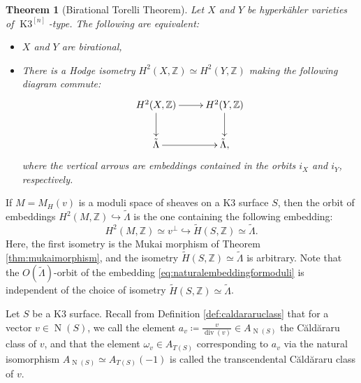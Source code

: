 \documentclass[11pt,twoside]{amsart}
\numberwithin{equation}{section}
\newtheorem{theorem}[dummy]{Theorem}
\theoremstyle{definition}
\theoremstyle{plain}
\newcommand{\Z}{\ensuremath{\mathbb{Z}}}
\def\Kn{{\ensuremath{\operatorname{K3}^{[n]}}}}
\def\N{\operatorname{N}}
\def\dv{\operatorname{div}}
\begin{document}
\begin{theorem}[Birational Torelli Theorem] \cite[Corollary 9.9]{Mar11}\label{thm:birationaltorelli}
    Let $X$ and $Y$ be hyperk\"ahler varieties of \Kn-type. The following are equivalent:
    \begin{itemize}
        \item[i)] $X$ and $Y$ are birational,
        \item[ii)] There is a Hodge isometry $H^2(X,\Z)\simeq H^2(Y,\Z)$ making the following diagram commute: \begin{equation*}
            \xymatrix{
            H^2(X,\Z) \ar[r] \ar[d] & H^2(Y,\Z) \ar[d]\\
           \tilde{\Lambda}\ar[r] & \tilde{\Lambda},
            }
        \end{equation*}
        where the vertical arrows are embeddings contained in the orbits $i_X$ and $i_Y$, respectively.
    \end{itemize}
\end{theorem}

If $M = M_H(v)$ is a moduli space of sheaves on a K3 surface $S$, then the orbit of embeddings $H^2(M,\Z)\hookrightarrow \tilde{\Lambda}$ is the one containing the following embedding: 
\begin{equation}\label{eq:naturalembeddingformoduli}
    H^2(M,\Z)\simeq v^\perp \hookrightarrow \tilde{H}(S,\Z)\simeq \tilde{\Lambda}.
\end{equation} 
Here, the first isometry is the Mukai morphism of Theorem \ref{thm:mukaimorphism}, and the isometry $\tilde{H}(S,\Z)\simeq \tilde{\Lambda}$ is arbitrary. Note that the $O(\tilde{\Lambda})$-orbit of the embedding \eqref{eq:naturalembeddingformoduli} is independent of the choice of isometry $\tilde{H}(S,\Z)\simeq \tilde{\Lambda}$.

Let $S$ be a K3 surface. Recall from Definition \ref{def:caldararuclass} that for a vector $v\in \N(S)$, we call the element $a_v\coloneqq \frac{v}{\dv(v)}\in A_{\N(S)}$ the C\u ald\u araru class of $v$, and that the element $\omega_v\in A_{T(S)}$ corresponding to $a_v$ via the natural isomorphism $A_{\N(S)}\simeq A_{T(S)}(-1)$ is called the transcendental C\u ald\u araru class of $v$.
\end{document}
